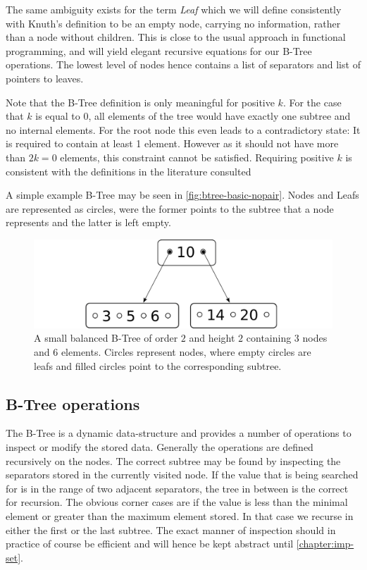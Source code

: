 The same ambiguity exists for the term \textit{Leaf} which we will define consistently with Knuth's definition \parencite{DBLP:books/lib/Knuth98a}
to be an empty node, carrying no information,
rather than a node without children.
This is close to the usual approach in functional programming,
and will yield elegant recursive equations for our B-Tree operations.
The lowest level of nodes hence contains a list of separators and
list of pointers to leaves.

Note that the B-Tree definition is only meaningful for positive $k$.
For the case that $k$ is equal to 0,
all elements of the tree would have exactly one subtree
and no internal elements.
For the root node this even leads to a contradictory state:
It is required to contain at least 1 element.
However as it should not have more than $2k = 0$ elements,
this constraint cannot be satisfied.
Requiring positive $k$ is consistent with the definitions
in the literature consulted \parencite{DBLP:journals/acta/BayerM72,DBLP:journals/csur/Comer79,DBLP:books/daglib/0023376}

A simple example B-Tree may be seen in \autoref{fig:btree-basic-nopair}.
Nodes and Leafs are represented as circles, were the former points to the
subtree that a node represents and the latter is left empty.

\begin{figure}
    \centering
    \includegraphics[width=0.5\linewidth]{figures/btree-basic-nopair.pdf}
    \caption{A small balanced B-Tree of order $2$ and
    height $2$ containing $3$ nodes and $6$ elements.
    Circles represent nodes, where empty circles are leafs and filled circles
    point to the corresponding subtree.}
    \label{fig:btree-basic-nopair}
\end{figure}

\subsection{B-Tree operations}

The B-Tree is a dynamic data-structure and provides
a number of operations to inspect or modify the stored data.
Generally the operations are defined recursively on the nodes.
The correct subtree may be found by inspecting the separators stored
in the currently visited node.
If the value that is being searched for is in the range of two
adjacent separators, the tree in between is the correct for recursion. 
The obvious corner cases are if the value is less than the
minimal element or greater than the maximum element stored.
In that case we recurse in either the first or the last subtree.
The exact manner of inspection should in practice of course
be efficient and will hence be kept abstract until \autoref{chapter:imp-set}.

